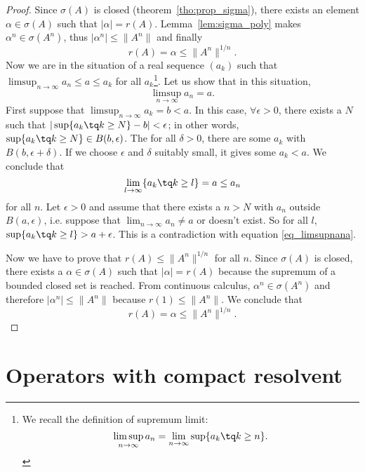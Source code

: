 \begin{proof}
	Since $\sigma(A)$ is closed (theorem~\ref{tho:prop_sigma}), there exists an element $\alpha\in\sigma(A)$ such that $|\alpha|=r(A)$. Lemma~\ref{lem:sigma_poly} makes $\alpha^n\in\sigma(A^n)$, thus $|\alpha^n|\leq\|A^n\|$ and finally
	\begin{equation}
	  r(A)=\alpha\leq\|A^n\|^{1/n}.
	\end{equation}
	Now we are in the situation of a real sequence $(a_k)$ such that $\limsup_{n\to\infty} a_n\leq a \leq a_k$ for all $a_k$\footnote{We recall the definition of supremum limit:
	\[
	  \limsup_{n\to\infty} a_n=\lim_{n\to\infty}\sup\{ a_k\tq k\geq n \}.
	\]
	}.		%
	Let us show that in this situation,
	\begin{equation} \label{eq_limsupnana}
	\limsup_{n\to\infty} a_n=a.
	\end{equation}
	 First suppose that $\limsup_{n\to\infty}a_k=b<a$.  In this case, $\forall \epsilon>0$, there exists a $N$ such that
	$  | \sup\{ a_k\tq k\geq N \}-b |<\epsilon$;
	in other words, $\sup\{ a_k\tq k\geq N \}\in B(b,\epsilon)$. The for all $\delta>0$, there are some $a_k$ with $B(b,\epsilon+\delta)$. If we choose $\epsilon$ and $\delta$ suitably small, it gives some $a_k<a$. We conclude that
	\[
	  \lim_{l\to\infty}\{ a_k\tq k\geq l \}=a\leq a_n
	\]
	for all $n$. Let $\epsilon>0$ and assume that there exists a $n>N$ with $a_n$ outside $B(a,\epsilon)$, i.e. suppose that $\lim_{n\to\infty}a_n\neq a$ or doesn't exist. So for all $l$, $\sup\{ a_k\tq k\geq l \}>a+\epsilon$. This is a contradiction with equation \eqref{eq_limsupnana}.

	Now we have to prove that $r(A)\leq \| A^n \|^{1/n}$ for all $n$. Since $\sigma(A)$ is closed, there exists a $\alpha\in\sigma(A)$ such that $| \alpha |=r(A)$ because the supremum of a bounded closed set is reached\angl. From continuous calculus,  $\alpha^n\in\sigma(A^n)$ and therefore $| \alpha^n |\leq\| A^n \|$ because $r(1)\leq \| A^n \|$. We conclude that
	\[
	  r(A)=\alpha\leq\| A^n \|^{1/n}.
	\]
\end{proof}

\section{Operators with compact resolvent}

